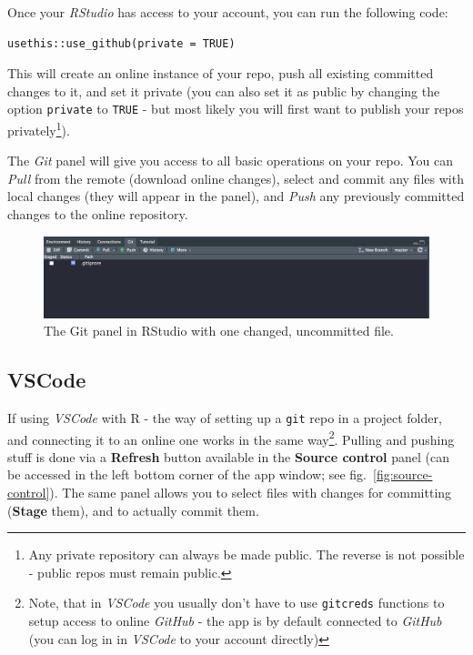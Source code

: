 \documentclass{tufte-handout}
\begin{document}
Once your \textit{RStudio} has access to your account, you can run the following code:

\begin{verbatim}
usethis::use_github(private = TRUE)
\end{verbatim}

This will create an online instance of your repo, push all existing committed changes to it, and set it private (you can also set it as public by changing the option \texttt{private} to \texttt{TRUE} - but most likely you will first want to publish your repos privately\footnote{Any private repository can always be made public. The reverse is not possible - public repos must remain public.}).

The \textit{Git} panel will give you access to all basic operations on your repo. You can \textit{Pull} from the remote (download online changes), select and commit any files with local changes (they will appear in the panel), and \textit{Push} any previously committed changes to the online repository.

\begin{figure}
    \includegraphics[width=1\linewidth]{Zrzut ekranu 2024-12-20 o 14.07.03.png}
    \caption{The Git panel in RStudio with one changed, uncommitted file.}
    \label{fig:gitpanel}
\end{figure}

\subsection{VSCode}

If using \textit{VSCode} with \textsf{R} - the way of setting up a \texttt{git} repo in a project folder, and connecting it to an online one works in the same way\footnote{Note, that in \textit{VSCode} you usually don't have to use \texttt{gitcreds} functions to setup access to online \textit{GitHub} - the app is by default connected to \textit{GitHub} (you can log in in \textit{VSCode} to your account directly)}. Pulling and pushing stuff is done via a \textbf{Refresh} button available in the \textbf{Source control} panel (can be accessed in the left bottom corner of the app window; see fig.~\ref{fig:source-control}). The same panel allows you to select files with changes for committing (\textbf{Stage} them), and to actually commit them.
\end{document}
